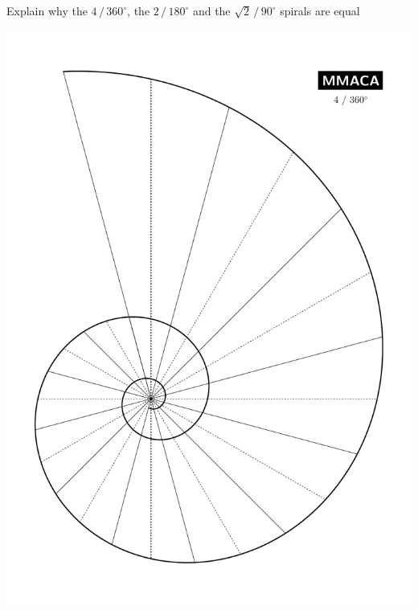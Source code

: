 \documentclass[a4paper,12pt]{article}
\begin{document}
    \begin{center}
    
        \large

        Explain why the $4 \, / \, 360^{\circ}$, the $2 \, / \, 180^{\circ}$ and the $\sqrt{2} \, / \, 90^{\circ}$ spirals are equal

        \bigskip \bigskip \bigskip
    
        \includegraphics[scale=0.3535]{./pictures/Spiral_4_360}

\end{center}
\end{document}
